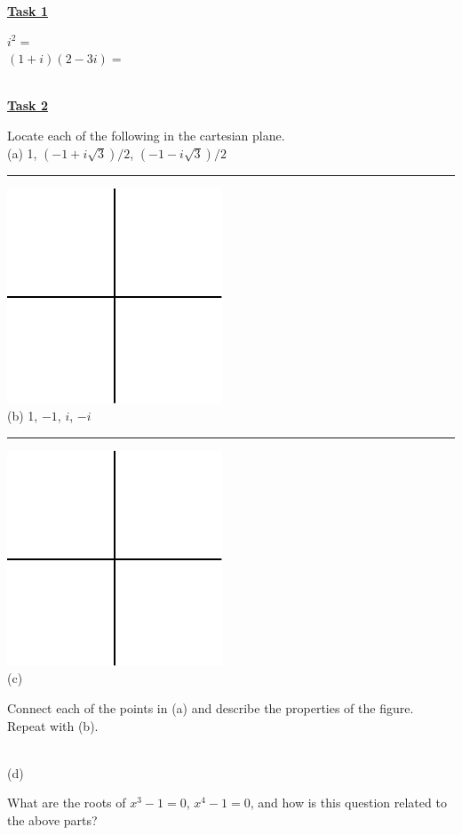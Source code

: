 \documentclass[12pt, fleqn, oneside]{book}
\begin{document}
\rule{0in}{.25in}
\underline{\bf{Task 1}} \begin{minipage}[t]{3in}$i^2 =$\\[.25in]
$(1+i)(2-3i)=$
\end{minipage}\\[.75in]
\underline{\bf{Task 2}} \begin{minipage}[t]{6in}Locate each of the following in the cartesian plane.\\[.25in]
(a) 1, $(-1+i\sqrt3)/2$, $(-1-i\sqrt3)/2$\\ \rule{4in}{0in}\includegraphics{page_12.pdf}\\
(b) 1, $-1$, $i$, $-i$\\ \rule{3in}{0in}\includegraphics{page_12.pdf}\\
(c) \begin{minipage}[t]{5in}Connect each of the points in (a) and describe the properties of the figure.  Repeat with (b).\end{minipage}\\[1in]
(d) \begin{minipage}[t]{5in}What are the roots of $x^3-1=0$, $x^4-1=0$, and how is this question related to the above parts?\end{minipage}
\end{minipage}
\end{document}
